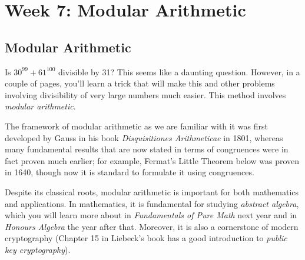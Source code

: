 \documentclass[11pt,dvipsnames]{book}
\numberwithin{figure}{section} %
\numberwithin{table}{section} %
\begin{document}
%
%


\part{Week 7: Modular Arithmetic}


\chapter{Modular Arithmetic}

%

\indent Is $30^{99}+61^{100}$  divisible by 31? This seems like a daunting question. However, in a couple of pages, you'll learn a trick that will make this and other problems involving divisibility of very large numbers much easier. This method involves {\it modular arithmetic}.

The framework of modular arithmetic as we are familiar with it was first developed by Gauss in his book {\it  Disquisitiones Arithmeticae} in 1801, whereas many fundamental results that are now stated in terms of congruences were in fact proven much earlier; for example, Fermat's Little Theorem below was proven in 1640, though now it is standard to formulate it using congruences.

Despite its classical roots, modular arithmetic is important for both mathematics and applications. In mathematics, it is fundamental for studying {\it abstract algebra}, which you will learn more about in {\it Fundamentals of Pure Math} next year and in {\it Honours Algebra} the year after that. Moreover, it is also a cornerstone of modern cryptography (Chapter 15 in Liebeck's book has a good introduction to {\it public key cryptography}). \\
\end{document}
